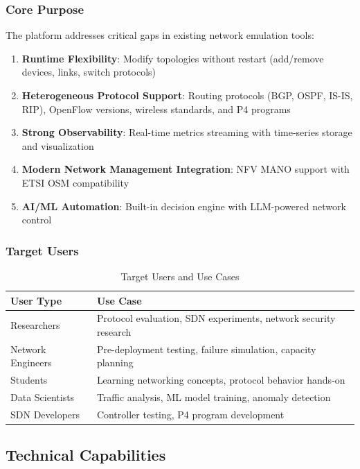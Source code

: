 \documentclass[10pt,a4paper]{article}
\begin{document}
\subsubsection{Core Purpose}

The platform addresses critical gaps in existing network emulation tools:

\begin{enumerate}[label=(\arabic*)]
\item \textbf{Runtime Flexibility}: Modify topologies without restart (add/remove devices, links, switch protocols)
\item \textbf{Heterogeneous Protocol Support}: Routing protocols (BGP, OSPF, IS-IS, RIP), OpenFlow versions, wireless standards, and P4 programs
\item \textbf{Strong Observability}: Real-time metrics streaming with time-series storage and visualization
\item \textbf{Modern Network Management Integration}: NFV MANO support with ETSI OSM compatibility
\item \textbf{AI/ML Automation}: Built-in decision engine with LLM-powered network control
\end{enumerate}

\subsubsection{Target Users}

\begin{table}[htbp]
\centering
\caption{Target Users and Use Cases}
\begin{tabularx}{\textwidth}{lX}
\toprule
\textbf{User Type} & \textbf{Use Case} \\
\midrule
Researchers & Protocol evaluation, SDN experiments, network security research \\
Network Engineers & Pre-deployment testing, failure simulation, capacity planning \\
Students & Learning networking concepts, protocol behavior hands-on \\
Data Scientists & Traffic analysis, ML model training, anomaly detection \\
SDN Developers & Controller testing, P4 program development \\
\bottomrule
\end{tabularx}
\end{table}

\subsection{Technical Capabilities}
\end{document}
